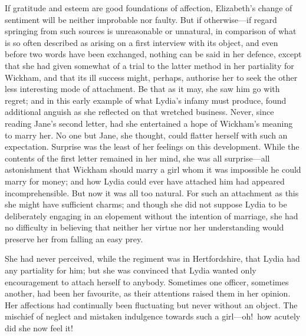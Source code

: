 \documentclass[12pt,english]{book}
\begin{document}
If gratitude and esteem are good foundations of affection, Elizabeth's
change of sentiment will be neither improbable nor faulty. But if
otherwise\mbox{---}if regard springing from such sources is unreasonable
or unnatural, in comparison of what is so often described as arising
on a first interview with its object, and even before two words have
been exchanged, nothing can be said in her defence, except that she
had given somewhat of a trial to the latter method in her partiality
for Wickham, and that its ill success might, perhaps, authorise her
to seek the other less interesting mode of attachment. Be that as
it may, she saw him go with regret; and in this early example of what
Lydia's infamy must produce, found additional anguish as she reflected
on that wretched business. Never, since reading Jane's second letter,
had she entertained a hope of Wickham's meaning to marry her. No one
but Jane, she thought, could flatter herself with such an expectation.
Surprise was the least of her feelings on this development. While
the contents of the first letter remained in her mind, she was all
surprise\mbox{---}all astonishment that Wickham should marry a girl
whom it was impossible he could marry for money; and how Lydia could
ever have attached him had appeared incomprehensible. But now it was
all too natural. For such an attachment as this she might have sufficient
charms; and though she did not suppose Lydia to be deliberately engaging
in an elopement without the intention of marriage, she had no difficulty
in believing that neither her virtue nor her understanding would preserve
her from falling an easy prey.

She had never perceived, while the regiment was in Hertfordshire,
that Lydia had any partiality for him; but she was convinced that
Lydia wanted only encouragement to attach herself to anybody. Sometimes
one officer, sometimes another, had been her favourite, as their attentions
raised them in her opinion. Her affections had continually been fluctuating
but never without an object. The mischief of neglect and mistaken
indulgence towards such a girl\mbox{---}oh!\ how acutely did she
now feel it!
\end{document}
